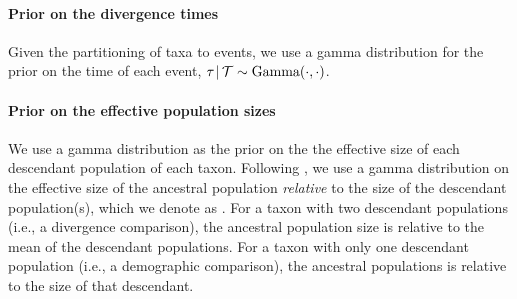 \paragraph{Prior on the divergence times}
Given the partitioning of taxa to events, we use a gamma
distribution for the prior on the time of each event,
$\tau_{} \,|\, \mathcal{T} \sim \textrm{Gamma}(\cdot, \cdot)$.

\paragraph{Prior on the effective population sizes}
We use a gamma distribution as the prior on the 
the effective size of each descendant population of each taxon.
Following \citet{Oaks2018ecoevolity},
we use a gamma distribution on the effective size of the ancestral population
\emph{relative} to the size of the descendant population(s), which we
denote as \rootrelativepopsize.
For a taxon with two descendant populations (i.e., a divergence comparison), the
ancestral population size is relative to the mean of the descendant
populations.
For a taxon with only one descendant population (i.e., a demographic
comparison), the ancestral populations is relative to the size of that
descendant.

